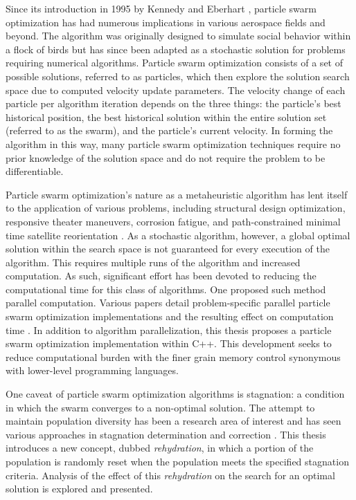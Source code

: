 \noindent Since its introduction in 1995 by Kennedy and Eberhart \citep{Initial_PSO}, particle swarm optimization has had numerous implications in various aerospace fields and beyond.
The algorithm was originally designed to simulate social behavior within a flock of birds but has since been adapted as a stochastic solution for problems
requiring numerical algorithms. Particle swarm optimization consists of a set of possible solutions, referred to as particles, which then explore the solution search space due to
computed velocity update parameters. The velocity change of each particle per algorithm iteration depends on the three things: the particle's best historical position, the best historical
solution within the entire solution set (referred to as the swarm), and the particle's current velocity. In forming the algorithm in this way, many particle swarm optimization techniques 
require no prior knowledge of the solution space and do not require the problem to be differentiable. \newline

\noindent Particle swarm optimization's nature as a metaheuristic algorithm has lent itself to the application of various problems,
including structural design optimization, responsive theater maneuvers, corrosion fatigue, and path-constrained minimal time satellite reorientation
\citep{PSO1, PSO2, PSO3, PSO4}. As a stochastic algorithm, however, a global optimal solution within the search space is not guaranteed for every execution of the algorithm. 
This requires multiple runs of the algorithm and increased computation. As such, significant effort has been devoted to reducing the computational time for this class of
algorithms. One proposed such method parallel computation. Various papers detail problem-specific parallel particle swarm optimization implementations and the resulting 
effect on computation time \citep{PPSO1, PPSO2, PPSO3}. In addition to algorithm parallelization, this thesis proposes a particle swarm optimization implementation within C++.
This development seeks to reduce computational
burden with the finer grain memory control synonymous with lower-level programming languages. \newline

\noindent One caveat of particle swarm optimization algorithms is stagnation: a condition in which the swarm converges to a non-optimal solution. The attempt to maintain population 
diversity has been a research area of interest and has seen various approaches in stagnation determination and correction \citep{PSOstag1, PSOstag2}. This thesis introduces a new concept,
dubbed \textit{rehydration}, in which a portion of the population is randomly reset when the population meets the specified stagnation criteria. Analysis of the effect of this
\textit{rehydration} on the search for an optimal solution is explored and presented.


